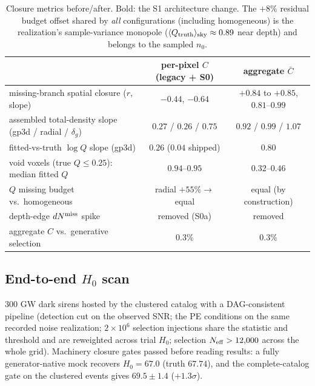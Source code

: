 \documentclass[11pt]{article}
\newcommand{\dNmiss}{dN^{\rm miss}}
\newcommand{\Cbar}{\bar{C}}
\begin{document}
\begin{table}[h!]
\centering
\small
\begin{tabular}{lcc}
\toprule
 & per-pixel $C$ (legacy + S0) & aggregate $\Cbar$ \\
\midrule
missing-branch spatial closure ($r$, slope) & $-0.44$, $-0.64$ & $\mathbf{+0.84}$ to $\mathbf{+0.85}$, $0.81$--$0.99$ \\
assembled total-density slope (gp3d / radial / $\delta_g$) & $0.27$ / $0.26$ / $0.75$ & $\mathbf{0.92}$ / $\mathbf{0.99}$ / $1.07$ \\
fitted-vs-truth $\log Q$ slope (gp3d) & $0.26$ \; ($0.04$ shipped) & $\mathbf{0.80}$ \\
void voxels (true $Q \le 0.25$): median fitted $Q$ & $0.94$--$0.95$ & $\mathbf{0.32}$--$\mathbf{0.46}$ \\
$Q$ missing budget vs.\ homogeneous & radial $+55\% \to$ equal & equal (by construction) \\
depth-edge $\dNmiss$ spike & removed (S0a) & removed \\
aggregate $C$ vs.\ generative selection & $0.3\%$ & $0.3\%$ \\
\bottomrule
\end{tabular}
\caption{Closure metrics before/after. Bold: the S1 architecture change. The
$+8\%$ residual budget offset shared by \emph{all} configurations (including
homogeneous) is the realization's sample-variance monopole
($\langle Q_{\rm truth}\rangle_{\rm sky} \approx 0.89$ near depth) and belongs to
the sampled $n_0$.}
\end{table}

\subsection{End-to-end $H_0$ scan}

300 GW dark sirens hosted by the clustered catalog with a DAG-consistent pipeline
(detection cut on the observed SNR; the PE conditions on the same recorded noise
realization; $2\times 10^6$ selection injections share the statistic and threshold
and are reweighted across trial $H_0$; selection $N_{\rm eff} > 12{,}000$ across the
whole grid). Machinery closure gates passed before reading results: a fully
generator-native mock recovers $H_0 = 67.0$ (truth $67.74$), and the complete-catalog
gate on the clustered events gives $69.5 \pm 1.4$ ($+1.3\sigma$).
\end{document}
